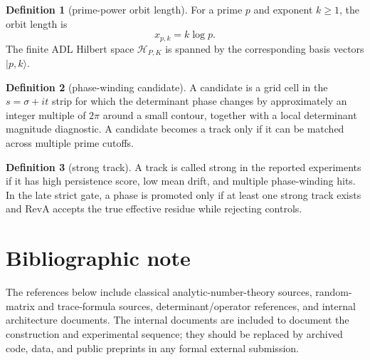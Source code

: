 \documentclass[11pt]{article}
\theoremstyle{definition}
\newtheorem{definition}{Definition}
\theoremstyle{plain}
\begin{document}
\begin{definition}[prime-power orbit length]
For a prime $p$ and exponent $k\ge1$, the orbit length is
\begin{equation}
  x_{p,k}=k\log p.
\end{equation}
The finite ADL Hilbert space $\mathcal H_{P,K}$ is spanned by the corresponding basis vectors $|p,k\rangle$.
\end{definition}

\begin{definition}[phase-winding candidate]
A candidate is a grid cell in the $s=\sigma+it$ strip for which the determinant phase changes by approximately an integer multiple of $2\pi$ around a small contour, together with a local determinant magnitude diagnostic.  A candidate becomes a track only if it can be matched across multiple prime cutoffs.
\end{definition}

\begin{definition}[strong track]
A track is called strong in the reported experiments if it has high persistence score, low mean drift, and multiple phase-winding hits.  In the late strict gate, a phase is promoted only if at least one strong track exists and RevA accepts the true effective residue while rejecting controls.
\end{definition}

\section{Bibliographic note}

The references below include classical analytic-number-theory sources, random-matrix and trace-formula sources, determinant/operator references, and internal architecture documents.  The internal documents are included to document the construction and experimental sequence; they should be replaced by archived code, data, and public preprints in any formal external submission.
\end{document}
